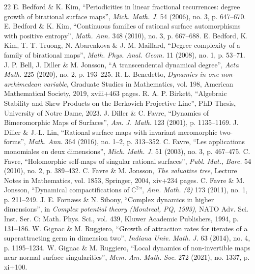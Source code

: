 \documentclass[11pt]{article}
\begin{document}
\clearpage
\begin{thebibliography}{22}
 E. Bedford \& K. Kim, ``Periodicities in linear fractional
recurrences: degree growth of birational surface maps'', \emph{Mich. Math. J.}
54 (2006), no. 3, p. 647--670.
 E. Bedford \& K. Kim, ``Continuous families of rational surface
automorphisms with positive entropy'', \emph{Math. Ann.} 348 (2010), no. 3,
p. 667--688.
 E. Bedford, K. Kim, T. T. Truong, N. Abarenkova \&
J.-M. Maillard, ``Degree complexity of a family of birational maps'',
\emph{Math. Phys. Anal. Geom.} 11 (2008), no. 1, p. 53--71.
 J. P. Bell, J. Diller \& M. Jonsson, ``A transcendental dynamical
degree'', \emph{Acta Math.} 225 (2020), no. 2, p. 193--225.
 R. L. Benedetto, \emph{Dynamics in one non-archimedean variable},
Graduate Studies in Mathematics, vol. 198, American Mathematical Society,
2019, xviii+463 pages.
 R. A. P. Birkett, ``Algebraic Stability and Skew Products on the
Berkovich Projective Line'', PhD Thesis, University of Notre Dame, 2023.
 J. Diller \& C. Favre, ``Dynamics of Bimeromorphic Maps of
Surfaces'', \emph{Am. J. Math.} 123 (2001), p. 1135--1169.
 J. Diller \& J.-L. Lin, ``Rational surface maps with invariant
meromorphic two-forms'', \emph{Math. Ann.} 364 (2016), no. 1--2, p. 313--352.
 C. Favre, ``Les applications monomiales en deux dimensions'',
\emph{Mich. Math. J.} 51 (2003), no. 3, p. 467--475.
 C. Favre, ``Holomorphic self-maps of singular rational
surfaces'', \emph{Publ. Mat., Barc.} 54 (2010), no. 2, p. 389--432.
 C. Favre \& M. Jonsson, \emph{The valuative tree}, Lecture
Notes in Mathematics, vol. 1853, Springer, 2004, xiv+234 pages.
 C. Favre \& M. Jonsson, ``Dynamical compactifications of
$\mathbb C^2$'', \emph{Ann. Math. (2)} 173 (2011), no. 1, p. 211--249.
 J. E. Fornæss \& N. Sibony, ``Complex dynamics in higher
dimensions'', in \emph{Complex potential theory (Montreal, PQ, 1993)}, NATO
Adv. Sci. Inst. Ser. C: Math. Phys. Sci., vol. 439, Kluwer Academic Publishers,
1994, p. 131--186.
 W. Gignac \& M. Ruggiero, ``Growth of attraction rates for
iterates of a superattracting germ in dimension two'',
\emph{Indiana Univ. Math. J.} 63 (2014), no. 4, p. 1195--1234.
 W. Gignac \& M. Ruggiero, ``Local dynamics of non-invertible
maps near normal surface singularities'', \emph{Mem. Am. Math. Soc.} 272
(2021), no. 1337, p. xi+100.

\end{thebibliography}
\end{document}
